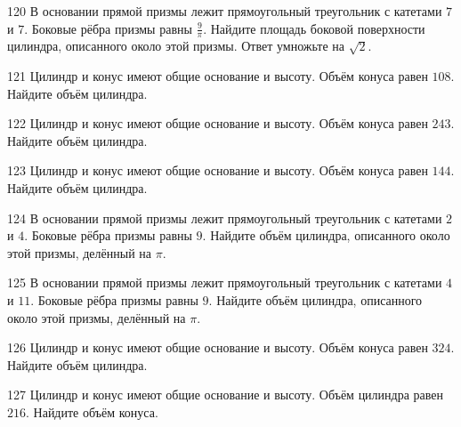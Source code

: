 \documentclass[4apaper]{article}
\begin{document}
\begin{taskBN}{120}
В основании прямой призмы лежит прямоугольный треугольник с катетами $7$ и $7$. Боковые рёбра призмы равны $\frac{9}{\pi}$. Найдите площадь боковой поверхности цилиндра, описанного около этой призмы. Ответ умножьте на $\sqrt{2}$.
\end{taskBN}

\begin{taskBN}{121}
Цилиндр и конус имеют общие основание и высоту. Объём конуса равен $108$. Найдите объём цилиндра.
\end{taskBN}

\begin{taskBN}{122}
Цилиндр и конус имеют общие основание и высоту. Объём конуса равен $243$. Найдите объём цилиндра.
\end{taskBN}

\begin{taskBN}{123}
Цилиндр и конус имеют общие основание и высоту. Объём конуса равен $144$. Найдите объём цилиндра.
\end{taskBN}

\begin{taskBN}{124}
В основании прямой призмы лежит прямоугольный треугольник с катетами $2$ и $4$. Боковые рёбра призмы равны $9$. Найдите объём цилиндра, описанного около этой призмы, делённый на $\pi$.
\end{taskBN}

\begin{taskBN}{125}
В основании прямой призмы лежит прямоугольный треугольник с катетами $4$ и $11$. Боковые рёбра призмы равны $9$. Найдите объём цилиндра, описанного около этой призмы, делённый на $\pi$.
\end{taskBN}

\begin{taskBN}{126}
Цилиндр и конус имеют общие основание и высоту. Объём конуса равен $324$. Найдите объём цилиндра.
\end{taskBN}

\begin{taskBN}{127}
Цилиндр и конус имеют общие основание и высоту. Объём цилиндра равен $216$. Найдите объём конуса.
\end{taskBN}
\end{document}
